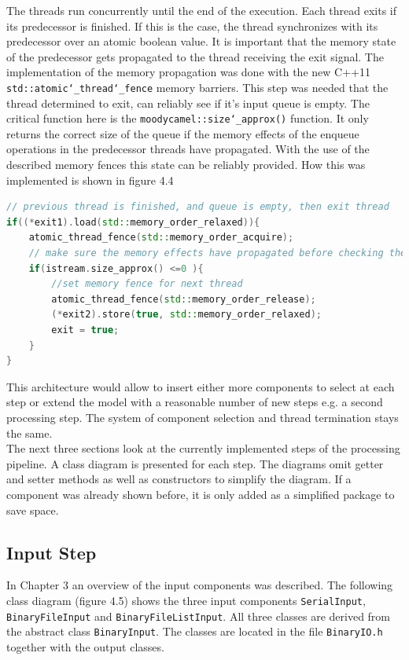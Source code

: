 The threads run concurrently until the end of the execution. Each thread exits if its predecessor is finished. If this is the case, the thread synchronizes with its predecessor over an atomic boolean value. It is important that the memory state of the predecessor gets propagated to the thread receiving the exit signal. The implementation of the memory propagation was done with the new C++11 \texttt{std::atomic\char`_thread\char`_fence} memory barriers. This step was needed that the thread determined to exit, can reliably see if it's input queue is empty. The critical function here is the \texttt{moodycamel::size\char`_approx()} function. It only returns the correct size of the queue if the memory effects of the enqueue operations in the predecessor threads have propagated. With the use of the described memory fences this state can be reliably provided. How this was implemented is shown in figure 4.4
\begin{lstlisting}[language=C++, caption=Code snippet highlighting the memory barriers.]
// previous thread is finished, and queue is empty, then exit thread
if((*exit1).load(std::memory_order_relaxed)){
    atomic_thread_fence(std::memory_order_acquire);
    // make sure the memory effects have propagated before checking the size
    if(istream.size_approx() <=0 ){
        //set memory fence for next thread
        atomic_thread_fence(std::memory_order_release);
        (*exit2).store(true, std::memory_order_relaxed);
        exit = true;
    }
}
\end{lstlisting}

This architecture would allow to insert either more components to select at each step or extend the model with a reasonable number of new steps e.g. a second processing step. The system of component selection and thread termination stays the same.\\
The next three sections look at the currently implemented steps of the processing pipeline. A class diagram is presented for each step. The diagrams omit getter and setter methods as well as constructors to simplify the diagram. If a component was already shown before, it is only added as a simplified package to save space.
\subsection{Input Step}
In Chapter 3 an overview of the input components was described. The following class diagram (figure 4.5) shows the three input components \texttt{SerialInput}, \texttt{BinaryFileInput} and \texttt{BinaryFileListInput}. All three classes are derived from the abstract class \texttt{BinaryInput}. The classes are located in the file \texttt{BinaryIO.h} together with the output classes.

